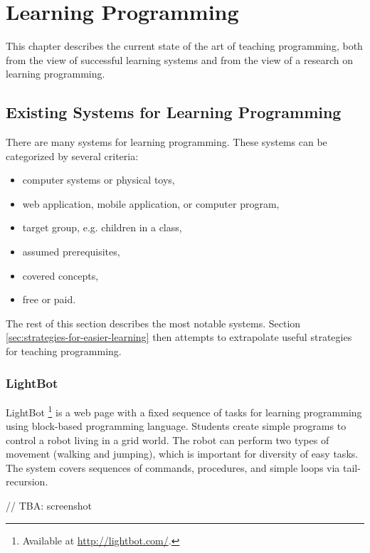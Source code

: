 \chapter{Learning Programming}
\label{chap:learning-programming}

This chapter describes the current state of the art of teaching programming, both from the view of successful learning systems and from the view of a research on learning programming.

\section{Existing Systems for Learning Programming}
\label{sec:existing-systems}

There are many systems for learning programming.
These systems can be categorized by several criteria:

\begin{itemize}
\item computer systems or physical toys,
\item web application, mobile application, or computer program,
\item target group, e.g. children in a class,
\item assumed prerequisites,
\item covered concepts, %
\item free or paid.
\end{itemize}

The rest of this section describes the most notable systems.
Section \ref{sec:strategies-for-easier-learning} then attempts to extrapolate useful strategies for teaching programming.


\subsection{LightBot}
\label{sec:lightbot}
LightBot%
\footnote{Available at \url{http://lightbot.com/}.}
is a web page with a fixed sequence of tasks for learning programming
using block-based programming language.
Students create simple programs to control a robot living in a grid world.
The robot can perform two types of movement (walking and jumping),
which is important for diversity of easy tasks.
The system covers sequences of commands, procedures, and simple loops via tail-recursion.

// TBA: screenshot


